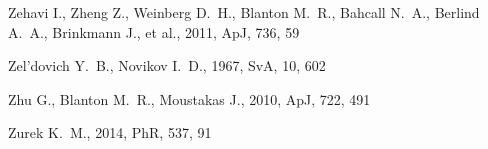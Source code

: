 \documentclass[fleqn,usenatbib]{mnras}
\begin{document}
\begin{thebibliography}{}
 Zehavi I., Zheng Z., Weinberg D.~H., Blanton M.~R., Bahcall N.~A., Berlind A.~A., Brinkmann J., et al., 2011, ApJ, 736, 59

 Zel'dovich Y.~B., Novikov I.~D., 1967, SvA, 10, 602

 Zhu G., Blanton M.~R., Moustakas J., 2010, ApJ, 722, 491

 Zurek K.~M., 2014, PhR, 537, 91

\end{thebibliography}
\label{lastpage}
\end{document}
